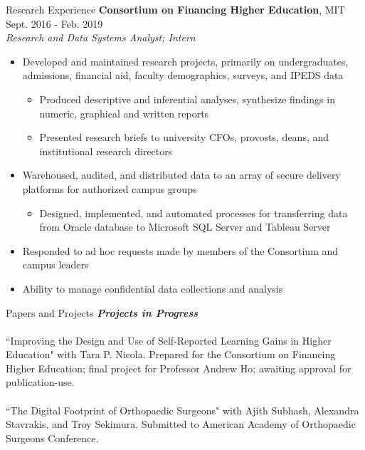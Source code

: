 \documentclass{resume} %
\begin{document}
\begin{rSection}{Research Experience}
{\bf Consortium on Financing Higher Education}{, MIT} \hfill {Sept. 2016 - Feb. 2019}\\
{\em Research and Data Systems Analyst; Intern}
\begin{itemize}[noitemsep]
    \item Developed and maintained research projects, primarily on undergraduates,
    admissions, financial aid, faculty demographics, surveys, and IPEDS data
    \begin{itemize}[noitemsep]
        \item Produced descriptive and inferential analyses, synthesize findings in
        numeric, graphical and written reports
       \item Presented research briefs to university CFOs, provosts, deans, and institutional research directors
    \end{itemize}
    \item Warehoused, audited, and distributed data to an array of secure delivery platforms for authorized campus groups
    \begin{itemize}[noitemsep]
        \item Designed, implemented, and automated processes for transferring data 
        from Oracle database to Microsoft SQL Server and Tableau Server
    \end{itemize}
    \item Responded to ad hoc requests made by members of the Consortium and campus leaders
    \item Ability to manage confidential data collections and analysis
    \end{itemize}

    \end{rSection}

\begin{rSection}{Papers and Projects}
    {\bf \em Projects in Progress}
    \\
    \\ {``Improving the Design and Use of Self-Reported Learning Gains in Higher Education" with Tara P. Nicola. Prepared for the Consortium on Financing Higher Education; 
    final project for Professor Andrew Ho; awaiting approval for publication-use.}
    \\
    \\ {``The Digital Footprint of Orthopaedic Surgeons" with Ajith Subhash, Alexandra Stavrakis, and Troy Sekimura. Submitted to American Academy of Orthopaedic Surgeons Conference.}
    \\
        \end{rSection}
\end{document}
